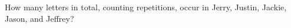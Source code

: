 How many letters in total, counting repetitions, occur in Jerry, Justin, Jackie, Jason, and Jeffrey?

